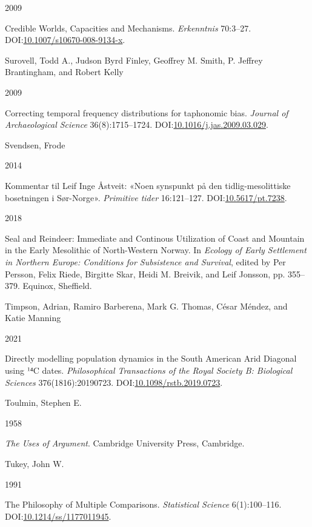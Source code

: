 \documentclass[
  a4paper,
  oneside]{uiophdthesis}
\newlength{\cslhangindent}
\newlength{\csllabelwidth}
\newlength{\cslentryspacingunit} %
\newenvironment{CSLReferences}[2] %
 {%
  \setlength{\parindent}{0pt}
  \ifodd #1
  \let\oldpar\par
  \def\par{\hangindent=\cslhangindent\oldpar}
  \fi
  \setlength{\parskip}{#2\cslentryspacingunit}
 }%
 {}
\newcommand{\CSLBlock}[1]{#1\hfill\break}
\newcommand{\CSLLeftMargin}[1]{\parbox[t]{\csllabelwidth}{#1}}
\newcommand{\CSLRightInline}[1]{\parbox[t]{\linewidth - \csllabelwidth}{#1}\break}
\begin{document}
\begin{CSLReferences}{0}{0}
\leavevmode{}%
\CSLLeftMargin{ 2009 }
\CSLRightInline{{Credible Worlds, Capacities and Mechanisms}. \emph{Erkenntnis} 70:3--27. DOI:\href{https://doi.org/10.1007/s10670-008-9134-x}{10.1007/s10670-008-9134-x}.}

\leavevmode{}%
\CSLBlock{Surovell, Todd A., Judson Byrd Finley, Geoffrey M. Smith, P. Jeffrey Brantingham, and Robert Kelly}
\CSLLeftMargin{ 2009}
\CSLRightInline{{Correcting temporal frequency distributions for taphonomic bias}. \emph{Journal of Archaeological Science} 36(8):1715--1724. DOI:\href{https://doi.org/10.1016/j.jas.2009.03.029}{10.1016/j.jas.2009.03.029}.}

\leavevmode{}%
\CSLBlock{Svendsen, Frode}
\CSLLeftMargin{ 2014}
\CSLRightInline{{Kommentar til Leif Inge Åstveit: «Noen synspunkt på den tidlig-mesolittiske bosetningen i Sør-Norge»}. \emph{Primitive tider} 16:121--127. DOI:\href{https://doi.org/10.5617/pt.7238}{10.5617/pt.7238}.}

\leavevmode{}%
\CSLLeftMargin{ 2018 }
\CSLRightInline{{Seal and Reindeer: Immediate and Continous Utilization of Coast and Mountain in the Early Mesolithic of North-Western Norway}. In \emph{{Ecology of Early Settlement in Northern Europe: Conditions for Subsistence and Survival}}, edited by Per Persson, Felix Riede, Birgitte Skar, Heidi M. Breivik, and Leif Jonsson, pp. 355--379. Equinox, Sheffield.}

\leavevmode{}%
\CSLBlock{Timpson, Adrian, Ramiro Barberena, Mark G. Thomas, César Méndez, and Katie Manning}
\CSLLeftMargin{ 2021}
\CSLRightInline{Directly modelling population dynamics in the South American Arid Diagonal using ¹⁴C dates. \emph{Philosophical Transactions of the Royal Society B: Biological Sciences} 376(1816):20190723. DOI:\href{https://doi.org/10.1098/rstb.2019.0723}{10.1098/rstb.2019.0723}.}

\leavevmode{}%
\CSLBlock{Toulmin, Stephen E.}
\CSLLeftMargin{ 1958}
\CSLRightInline{\emph{{The Uses of Argument}}. Cambridge University Press, Cambridge.}

\leavevmode{}%
\CSLBlock{Tukey, John W.}
\CSLLeftMargin{ 1991}
\CSLRightInline{{The Philosophy of Multiple Comparisons}. \emph{Statistical Science} 6(1):100--116. DOI:\href{https://doi.org/10.1214/ss/1177011945}{10.1214/ss/1177011945}.}


\end{CSLReferences}
\end{document}
